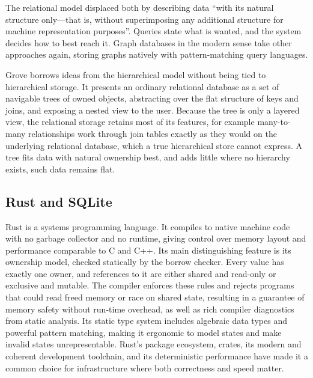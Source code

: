 The relational model displaced both by describing data
``with its natural structure only---that is, without superimposing
any additional structure for machine representation purposes''\autocite{codd1970}.
Queries state what is wanted, and the system decides how to best reach it.
Graph databases in the modern sense take other approaches again,
storing graphs natively with pattern-matching query languages.

Grove borrows ideas from the hierarchical model
without being tied to hierarchical storage.
It presents an ordinary relational database
as a set of navigable trees of owned objects,
abstracting over the flat structure of keys and joins,
and exposing a nested view to the user.
Because the tree is only a layered view,
the relational storage retains most of its features,
for example many-to-many relationships work through join tables
exactly as they would on the underlying relational database,
which a true hierarchical store cannot express.
A tree fits data with natural ownership best,
and adds little where no hierarchy exists, such data remains flat.



\subsection{Rust and SQLite}

Rust is a systems programming language.
It compiles to native machine code with no garbage collector and no runtime,
giving control over memory layout and performance comparable to C and C++.
Its main distinguishing feature is its ownership model,
checked statically by the borrow checker.
Every value has exactly one owner,
and references to it are either shared and read-only or exclusive and mutable.
The compiler enforces these rules
and rejects programs that could read freed memory or race on shared state,
resulting in a guarantee of memory safety without run-time overhead,
as well as rich compiler diagnostics from static analysis.
Its static type system includes algebraic data types
and powerful pattern matching, making it ergonomic to model states
and make invalid states unrepresentable.
Rust's package ecosystem, crates, its modern and coherent development toolchain,
and its deterministic performance have made it a common choice
for infrastructure where both correctness and speed matter.

